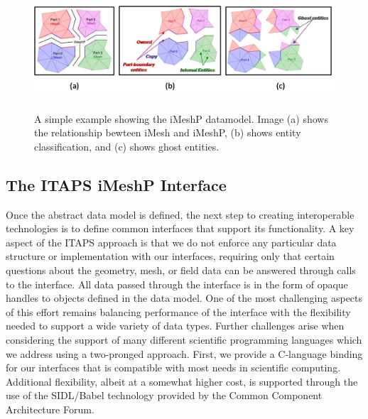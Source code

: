\documentclass[letterpaper]{jpconf}
\begin{document}
\begin{figure}[htb] 
\begin{center}
\includegraphics[height=1.75in]{Figures/imeshp.jpg}
\end{center}
\caption{A simple example showing the iMeshP datamodel.  Image (a) shows the relationship bewteen iMesh and iMeshP, (b) shows entity classification, and (c) shows ghost entities.}
\label{fig:data_model}
\end{figure}

\subsection{The ITAPS iMeshP Interface} 
\label{sec:interface}

Once the abstract data model is defined, the next step to creating
interoperable technologies is to define common interfaces that support
its functionality.  A key aspect of the ITAPS approach is that we do
not enforce any particular data structure or implementation with our
interfaces, requiring only that certain questions about the geometry,
mesh, or field data can be answered through calls to the
interface. All data passed through the interface is in the form of
opaque handles to objects defined in the data model.  One of the most
challenging aspects of this effort remains balancing performance of
the interface with the flexibility needed to support a wide variety of
data types.  Further challenges arise when considering the support of
many different scientific programming languages which we address using
a two-pronged approach.  First, we provide a C-language binding for
our interfaces that is compatible with most needs in scientific
computing.  Additional flexibility, albeit at a somewhat higher cost,
is supported through the use of the SIDL/Babel technology \cite{babel}
provided by the Common Component Architecture Forum.
\end{document}
